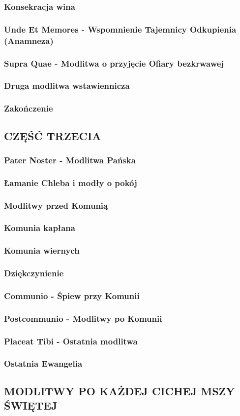 \documentclass[10pt,titlepage]{article}
\begin{document}
	\subsubsection{Konsekracja wina}
	\subsubsection{Unde Et Memores - Wspomnienie Tajemnicy Odkupienia (Anamneza)}
	\subsubsection{Supra Quae - Modlitwa o przyjęcie Ofiary bezkrwawej}
	\subsubsection{Druga modlitwa wstawiennicza}
	\subsubsection{Zakończenie}
	
	\subsection{CZĘŚĆ TRZECIA}
	
	\subsubsection{Pater Noster - Modlitwa Pańska}
	\subsubsection{Łamanie Chleba i modły o pokój}
	\subsubsection{Modlitwy przed Komunią}
	\subsubsection{Komunia kapłana}
	\subsubsection{Komunia wiernych}
	\subsubsection{Dziękczynienie}
	\subsubsection{Communio - Śpiew przy Komunii}
	\subsubsection{Postcommunio - Modlitwy po Komunii}
	\subsubsection{Placeat Tibi - Ostatnia modlitwa}
	\subsubsection{Ostatnia Ewangelia}
	
	\subsection{MODLITWY PO KAŻDEJ CICHEJ MSZY ŚWIĘTEJ}
	
\end{document}
